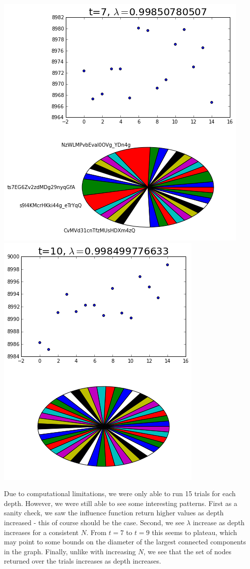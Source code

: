\documentclass{article}
\begin{document}
{		\includegraphics[scale=0.4]{full_7t}
		\hspace*{2cm}
		\includegraphics[scale=0.4]{full_10t}
		\par}	
		
		Due to computational limitations, we were only able to run 15 trials for each depth. However, we were still able to see some interesting patterns. First as a sanity check, we saw the influence function return higher values as depth increased - this of course should be the case. Second, we see $\lambda$ increase as depth increases for a consistent $N$. From $t=7$ to $t=9$ this seems to plateau, which may point to some bounds on the diameter of the largest connected components in the graph. Finally, unlike with increasing $N$, we see that the set of nodes returned over the trials increases as depth increases.
\end{document}
